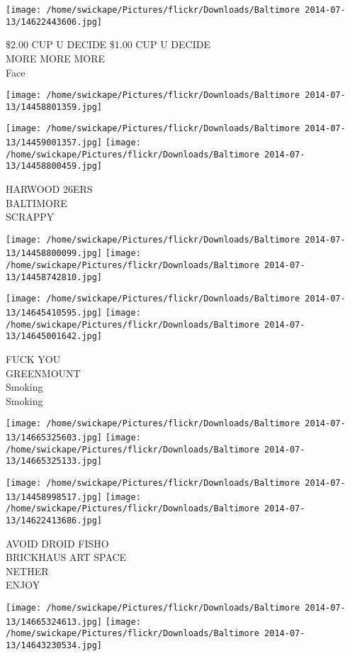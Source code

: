 \documentclass[10pt,letterpaper]{article}
\begin{document}
\texttt{[image: /home/swickape/Pictures/flickr/Downloads/Baltimore 2014-07-13/14622443606.jpg]}

\$2.00 CUP U DECIDE \$1.00 CUP U DECIDE\\
MORE MORE MORE\\
Face
\pagebreak

\texttt{[image: /home/swickape/Pictures/flickr/Downloads/Baltimore 2014-07-13/14458801359.jpg]}

\vspace{0.25in}
\texttt{[image: /home/swickape/Pictures/flickr/Downloads/Baltimore 2014-07-13/14459001357.jpg]}
\texttt{[image: /home/swickape/Pictures/flickr/Downloads/Baltimore 2014-07-13/14458800459.jpg]}

HARWOOD 26ERS\\
BALTIMORE\\
SCRAPPY
\pagebreak

\texttt{[image: /home/swickape/Pictures/flickr/Downloads/Baltimore 2014-07-13/14458800099.jpg]}
\texttt{[image: /home/swickape/Pictures/flickr/Downloads/Baltimore 2014-07-13/14458742810.jpg]}

\texttt{[image: /home/swickape/Pictures/flickr/Downloads/Baltimore 2014-07-13/14645410595.jpg]}
\texttt{[image: /home/swickape/Pictures/flickr/Downloads/Baltimore 2014-07-13/14645001642.jpg]}

FUCK YOU\\
GREENMOUNT\\
Smoking\\
Smoking
\pagebreak

\texttt{[image: /home/swickape/Pictures/flickr/Downloads/Baltimore 2014-07-13/14665325603.jpg]}
\texttt{[image: /home/swickape/Pictures/flickr/Downloads/Baltimore 2014-07-13/14665325133.jpg]}

\texttt{[image: /home/swickape/Pictures/flickr/Downloads/Baltimore 2014-07-13/14458998517.jpg]}
\texttt{[image: /home/swickape/Pictures/flickr/Downloads/Baltimore 2014-07-13/14622413686.jpg]}

AVOID DROID FISHO\\
BRICKHAUS ART SPACE\\
NETHER\\
ENJOY
\pagebreak

\texttt{[image: /home/swickape/Pictures/flickr/Downloads/Baltimore 2014-07-13/14665324613.jpg]}
\texttt{[image: /home/swickape/Pictures/flickr/Downloads/Baltimore 2014-07-13/14643230534.jpg]}
\end{document}

